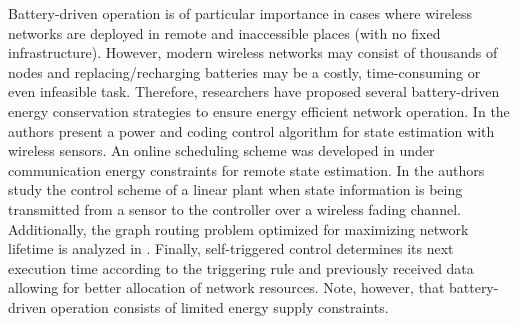 \documentclass[twocolumn]{autart}    %
\begin{document}
Battery-driven operation is of particular importance in cases where wireless networks are deployed in remote and inaccessible places (with no fixed infrastructure). 
However, modern wireless networks may consist of thousands of nodes and replacing/recharging batteries may be a costly, time-consuming or even infeasible task. 
Therefore, researchers have proposed several battery-driven energy conservation strategies to ensure energy efficient network operation. 
In \cite{2010:Quevedo_Ahlen_Ostergaard} the authors present a power and coding control algorithm for state estimation with wireless sensors. 
An online scheduling scheme was developed in \cite{2014:Han_Cheng_Chen_Shi} under communication energy constraints for remote state estimation. 
In \cite{2014:Gatsis_Ribeiro_Pappas} the authors study the control scheme of a linear plant when state information is being transmitted from a sensor to the controller over a wireless fading channel. 
Additionally, the graph routing problem optimized for maximizing network lifetime is analyzed in \cite{2016:Wu_Gunatilaka_Saifullah_Sha_Tiwari_Lu_Chen}.
Finally, self-triggered control determines its next execution time according to the triggering rule and previously received data \cite{2009:Wang_Lemmon} allowing for better allocation of network resources. 
Note, however, that battery-driven operation consists of limited energy supply constraints. 
\end{document}
